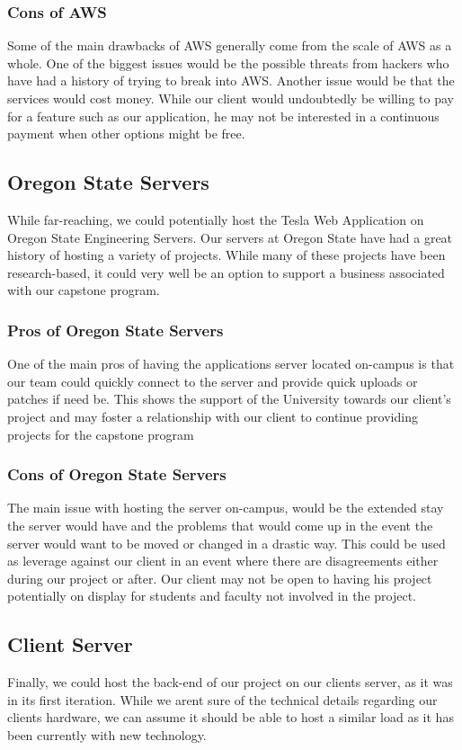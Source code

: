 \documentclass[onecolumn, draftclsnofoot,10pt, compsoc]{IEEEtran}
\begin{document}
\subsubsection{Cons of AWS}
Some of the main drawbacks of AWS generally come from the scale of AWS as a whole. One of the biggest issues would be the possible threats from hackers who have had a history of trying to break into AWS. Another issue would be that the services would cost money.\cite{davis_2017} While our client would undoubtedly be willing to pay for a feature such as our application, he may not be interested in a continuous payment when other options might be free. 

\subsection{Oregon State Servers}
While far-reaching, we could potentially host the Tesla Web Application on Oregon State Engineering Servers. Our servers at Oregon State have had a great history of hosting a variety of projects. While many of these projects have been research-based, it could very well be an option to support a business associated with our capstone program.

\subsubsection{Pros of Oregon State Servers}
One of the main pros of having the application\textquotesingle s server located on-campus is that our team could quickly connect to the server and provide quick uploads or patches if need be. This shows the support of the University towards our client’s project and may foster a relationship with our client to continue providing projects for the capstone program

\subsubsection{Cons of Oregon State Servers}
The main issue with hosting the server on-campus, would be the extended stay the server would have and the problems that would come up in the event the server would want to be moved or changed in a drastic way. This could be used as leverage against our client in an event where there are disagreements either during our project or after. Our client may not be open to having his project potentially on display for students and faculty not involved in the project.

\subsection{Client Server}
Finally, we could host the back-end of our project on our client\textquotesingle s server, as it was in its first iteration. While we aren\textquotesingle t sure of the technical details regarding our client\textquotesingle s hardware, we can assume it should be able to host a similar load as it has been currently with new technology.
\end{document}
